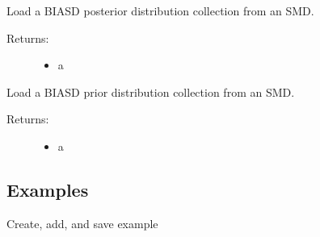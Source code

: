 \documentclass[letterpaper,10pt,english]{sphinxmanual}
\begin{document}

\begin{fulllineitems}
\label{code_smd:smd.read.posterior}
Load a BIASD posterior distribution collection from an SMD.
\begin{description}
\item[{Returns:}] \leavevmode\begin{itemize}
\item {} 
a 

\end{itemize}

\end{description}

\end{fulllineitems}


\begin{fulllineitems}
\label{code_smd:smd.read.priors}
Load a BIASD prior distribution collection from an SMD.
\begin{description}
\item[{Returns:}] \leavevmode\begin{itemize}
\item {} 
a 

\end{itemize}

\end{description}

\end{fulllineitems}



\subsection{Examples}
\label{code_smd:examples}
Create, add, and save example
\end{document}
